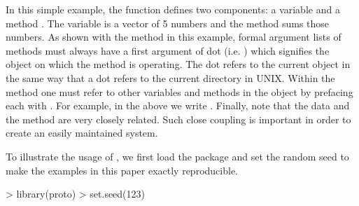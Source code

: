 \documentclass{Z}
\begin{document}

In this simple example, the  function defines two
components: a variable  and a method .  The variable
 is a vector of 5 numbers and the method sums those numbers.
As shown with the  method in this example, formal argument
lists of methods must always have a first argument of dot
(i.e. )  which signifies the object on which the method is
operating.  The dot refers to the current object in the same way that
a dot refers to the current directory in UNIX.  Within the method one
must refer to other variables and methods in the object by prefacing
each with .  For example, in the above we write
.  Finally, note that the data and the method are very
closely related.  Such close coupling is important in order to create
an easily maintained system.

To illustrate the usage of , we first load the package and
set the random seed to make the examples in this paper exactly
reproducible.

\begin{Schunk}
\begin{Sinput}
> library(proto)
> set.seed(123)
\end{Sinput}
\end{Schunk}
\end{document}
